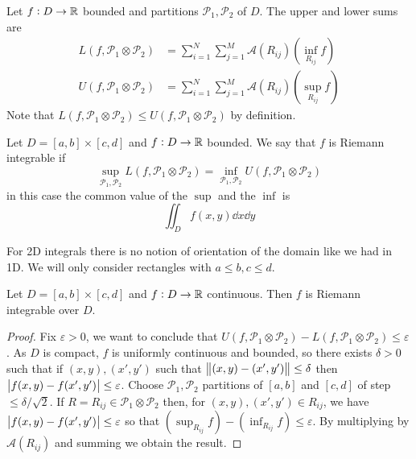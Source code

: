 \documentclass[12pt]{extarticle}
\begin{document}
\begin{definition}
    Let $f : D \to \mathbb{R}$ bounded and partitions $\mathcal{P_1}, \mathcal{P_2}$ of $D$.
    The upper and lower sums are
    \begin{align}
        L(f, \mathcal{P}_1 \otimes \mathcal{P}_2) & = \sum_{i = 1}^N \sum_{j = 1}^M \mathcal{A}(R_{ij}) \left( \inf_{R_{ij}} f \right) \\
        U(f, \mathcal{P}_1 \otimes \mathcal{P}_2) & = \sum_{i = 1}^N \sum_{j = 1}^M \mathcal{A}(R_{ij}) \left( \sup_{R_{ij}} f \right)
    \end{align}
    Note that $L(f, \mathcal{P}_1 \otimes \mathcal{P}_2) \leq U(f, \mathcal{P}_1 \otimes \mathcal{P}_2)$ by definition.
\end{definition}

\begin{definition}
    Let $D=[a, b] \times [c, d]$ and $f : D \to \mathbb{R}$ bounded.
    We say that $f$ is Riemann integrable if
    \begin{equation}
        \sup_{\mathcal P_1, \mathcal P_2}         L(f, \mathcal P_1 \otimes \mathcal P_2) = \inf_{\mathcal P_1, \mathcal P_2} U (f, \mathcal P_1 \otimes \mathcal P_2)
    \end{equation}
    in this case the common value of the $\sup$ and the $\inf$ is
    \begin{equation}
        \iint_D f(x, y) \dd{x} \dd{y}
    \end{equation}
\end{definition}

\begin{remark}[orientation]
    For 2D integrals there is no notion of orientation of the domain like we had in 1D.
    We will only consider rectangles with $a \leq b, c \leq d$.
\end{remark}

\begin{proposition}
    Let $D=[a, b] \times [c, d]$ and $f : D \to \mathbb{R}$ continuous.
    Then $f$ is Riemann integrable over $D$.
\end{proposition}

\begin{proof}
    Fix $\varepsilon > 0$, we want to conclude that $U(f, \mathcal P_1 \otimes \mathcal P_2) - L(f, \mathcal P_1 \otimes \mathcal P_2) \leq \varepsilon$.
    As $D$ is compact, $f$ is uniformly continuous and bounded, so there exists $\delta > 0$ such that if $(x, y), (x', y')$ such that $\norm{(x, y) - (x', y')} \leq \delta$ then $\abs{f(x, y) - f(x', y')}\leq \varepsilon$.
    Choose $\mathcal P_1, \mathcal P_2$ partitions of $[a, b]$ and $[c, d]$ of step $\leq \delta / \sqrt{2}$. If $R = R_{ij} \in \mathcal P_1 \otimes \mathcal P_2$ then, for $(x, y), (x', y') \in R_{ij}$, we have $\abs{f(x, y) - f(x', y')}\leq \varepsilon$ so that $(\sup_{R_{ij}} f) - (\inf_{R_{ij}} f) \leq \varepsilon$.
    By multiplying by $\mathcal A(R_{ij})$ and summing we obtain the result.
\end{proof}
\end{document}
